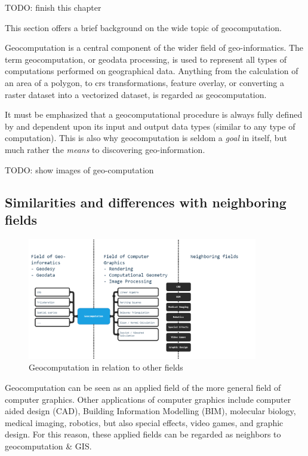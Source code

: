 \begin{note}
  TODO: finish this chapter
\end{note}

This section offers a brief background on the wide topic of geocomputation. 


Geocomputation is a central component of the wider field of geo-informatics. 
The term geocomputation, or geodata processing, is used to represent all types of computations performed on geographical data. 
Anything from the calculation of an area of a polygon, to \ac{crs} transformations, feature overlay, or converting a raster dataset into a vectorized dataset, is regarded as geocomputation.

It must be emphasized that a geocomputational procedure is always fully defined by and dependent upon its input and output data types (similar to any type of computation). 
This is also why geocomputation is seldom a \emph{goal} in itself, but much rather the \emph{means} to discovering geo-information. 

\begin{note}
  TODO: show images of geo-computation
\end{note}

\subsection{Similarities and differences with neighboring fields}

\begin{figure}
  \centering
  \graphicspath{ {../../assets/diagrams/} }
  \includegraphics[width=380px]{geocomputation.png}
  \caption{Geocomputation in relation to other fields}
  \label{fig:geocomputation}
\end{figure}

Geocomputation can be seen as an applied field of the more general field of computer graphics. 
Other applications of computer graphics include computer aided design (CAD), Building Information Modelling (BIM), molecular biology, medical imaging, robotics, but also special effects, video games, and graphic design.
For this reason, these applied fields can be regarded as neighbors to geocomputation \& GIS. 

